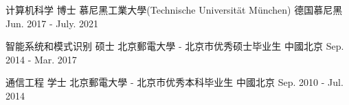 



\begin{cventries}

\cventry
{计算机科学 博士} %
{慕尼黑工業大學(Technische Universität München)} %
{德国慕尼黑} %
{Jun. 2017 - July. 2021} %
{ %
}


\cventry
{智能系统和模式识别 硕士} %
{北京郵電大學 - 北京市优秀硕士毕业生} %
{中國北京} %
{Sep. 2014 - Mar. 2017} %
{ %
}


\cventry
{通信工程 学士} %
{北京郵電大學 - 北京市优秀本科毕业生} %
{中國北京} %
{Sep. 2010 - Jul. 2014} %
{ %
}%

\end{cventries}
